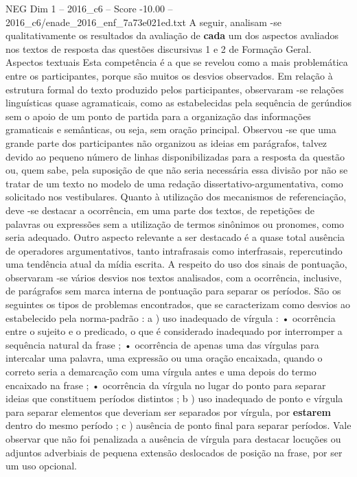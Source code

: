 \begin{textsample}{NEG Dim 1 – 2016\_c6 – Score -10.00 – 2016\_c6/enade\_2016\_enf\_7a73e021ed.txt}
A seguir, analisam -se qualitativamente os resultados da avaliação de \textbf{cada} um dos aspectos avaliados nos textos de resposta das questões discursivas 1 e 2 de Formação Geral.
Aspectos textuais Esta competência é a que se revelou como a mais problemática entre os participantes, porque são muitos os desvios observados.
Em relação à estrutura formal do texto produzido pelos participantes, observaram -se relações linguísticas quase agramaticais, como as estabelecidas pela sequência de gerúndios sem o apoio de um ponto de partida para a organização das informações gramaticais e semânticas, ou seja, sem oração principal.
Observou -se que uma grande parte dos participantes não organizou as ideias em parágrafos, talvez devido ao pequeno número de linhas disponibilizadas para a resposta da questão ou, quem sabe, pela suposição de que não seria necessária essa divisão por não se tratar de um texto no modelo de uma redação dissertativo-argumentativa, como solicitado nos vestibulares.
Quanto à utilização dos mecanismos de referenciação, deve -se destacar a ocorrência, em uma parte dos textos, de repetições de palavras ou expressões sem a utilização de termos sinônimos ou pronomes, como seria adequado.
Outro aspecto relevante a ser destacado é a quase total ausência de operadores argumentativos, tanto intrafrasais como interfrasais, repercutindo uma tendência atual da mídia escrita.
A respeito do uso dos sinais de pontuação, observaram -se vários desvios nos textos analisados, com a ocorrência, inclusive, de parágrafos sem marca interna de pontuação para separar os períodos.
São os seguintes os tipos de problemas encontrados, que se caracterizam como desvios ao estabelecido pela norma-padrão : a ) uso inadequado de vírgula : • ocorrência entre o sujeito e o predicado, o que é considerado inadequado por interromper a sequência natural da frase ; • ocorrência de apenas uma das vírgulas para intercalar uma palavra, uma expressão ou uma oração encaixada, quando o correto seria a demarcação com uma vírgula antes e uma depois do termo encaixado na frase ; • ocorrência da vírgula no lugar do ponto para separar ideias que constituem períodos distintos ; b ) uso inadequado de ponto e vírgula para separar elementos que deveriam ser separados por vírgula, por \textbf{estarem} dentro do mesmo período ; c ) ausência de ponto final para separar períodos.
Vale observar que não foi penalizada a ausência de vírgula para destacar locuções ou adjuntos adverbiais de pequena extensão deslocados de posição na frase, por ser um uso opcional.

\end{textsample}
